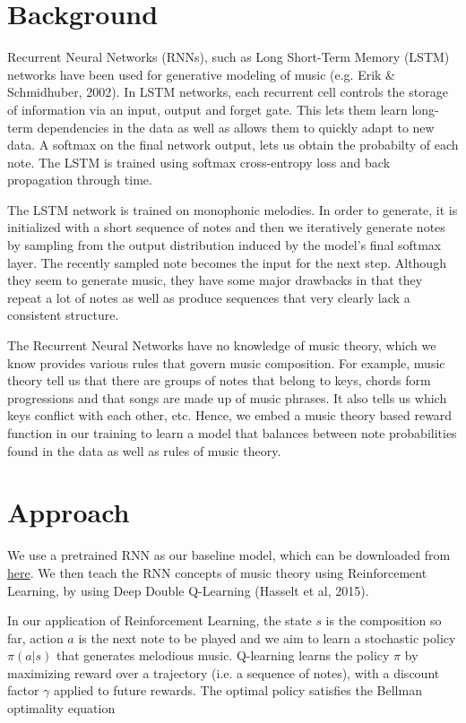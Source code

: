 \documentclass{article}
\begin{document}
\section{Background}

Recurrent Neural Networks (RNNs), such as Long Short-Term Memory (LSTM) networks have been used for generative modeling of music (e.g. Erik \& Schmidhuber, 2002).
In LSTM networks, each recurrent cell controls the storage of information via an input, output and forget gate. This lets them learn long-term
dependencies in the data as well as allows them to quickly adapt to new data. A softmax on the final network output, lets us obtain the probabilty of each note.
The LSTM is trained using softmax cross-entropy loss and back propagation through time.

The LSTM network is trained on monophonic melodies. In order to generate, it is initialized with a short sequence of notes and then we iteratively
generate notes by sampling from the output distribution induced by the model's final softmax layer. The recently sampled note becomes the input for the next step.
Although they seem to generate music, they have some major drawbacks in that they repeat a lot of notes as well as produce sequences that very clearly lack a consistent structure.

The Recurrent Neural Networks have no knowledge of music theory, which we know provides various rules that govern music composition.
For example, music theory tell us that there are groups of notes that belong to keys, chords form progressions and that songs are made up of
music phrases. It also tells us which keys conflict with each other, etc. Hence, we embed a music theory based reward function in our
training to learn a model that balances between note probabilities found in the data as well as rules of music theory.

\section{Approach}

We use a pretrained RNN as our baseline model, which can be downloaded from \href{http://download.magenta.tensorflow.org/models/rl_tuner_note_rnn.ckpt}{here}.
We then teach the RNN concepts of music theory using Reinforcement Learning, by using Deep Double Q-Learning (Hasselt et al, 2015).

In our application of Reinforcement Learning, the state $s$ is the composition so far, action $a$ is the next note to be played and we aim to learn a stochastic policy $\pi(a|s)$
that generates melodious music. Q-learning learns the policy $\pi$ by maximizing reward over a trajectory (i.e. a sequence of notes), with a discount factor $\gamma$ applied
to future rewards. The optimal policy satisfies the Bellman optimality equation
\end{document}

